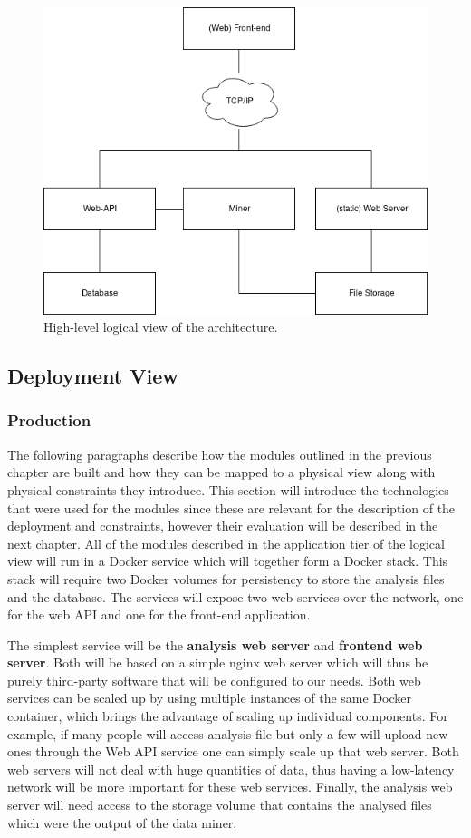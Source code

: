 \begin{figure}
    \centering
    \includegraphics[width=12cm]{images/highlevelarchitecture.png}
    \caption{High-level logical view of the architecture.}
    \label{fig:highlevelview}
\end{figure}


\subsection{Deployment View}
\subsubsection{Production}
The following paragraphs describe how the modules outlined in the previous chapter are built and how they can be mapped to a physical view along with physical constraints they introduce. This section will introduce the technologies that were used for the modules since these are relevant for the description of the deployment and constraints, however their evaluation will be described in the next chapter.
All of the modules described in the application tier of the logical view will run in a Docker service which will together form a Docker stack. This stack will require two Docker volumes for persistency to store the analysis files and the database. The services will expose two web-services over the network, one for the web API and one for the front-end application.

The simplest service will be the \textbf{analysis web server} and \textbf{frontend web server}. Both will be based on a simple nginx web server which will thus be purely third-party software that will be configured to our needs. Both web services can be scaled up by using multiple instances of the same Docker container, which brings the advantage of scaling up individual components. For example, if many people will access analysis file but only a few will upload new ones through the Web API service one can simply scale up that web server. Both web servers will not deal with huge quantities of data, thus having a low-latency network will be more important for these web services. Finally, the analysis web server will need access to the storage volume that contains the analysed files which were the output of the data miner.

